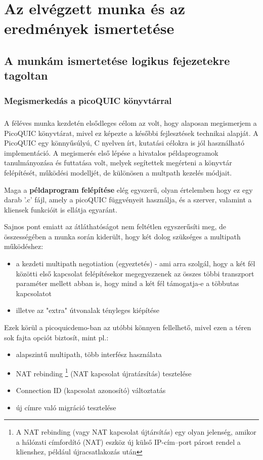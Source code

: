 \documentclass[a4paper,oneside]{article}
\begin{document}
\newpage
\section{Az elvégzett munka és az eredmények ismertetése}
\label{sec:az-elvegzett-munka}


\subsection{A munkám ismertetése logikus fejezetekre tagoltan}
\label{sec:a-munkam-ismert}

\subsubsection{Megismerkedás a picoQUIC könyvtárral}

\subparagraph{}
A féléves munka kezdetén elsődleges célom az volt, hogy alaposan megismerjem a 
PicoQUIC könyvtárat, mivel ez képezte a későbbi 
fejlesztések technikai alapját. A PicoQUIC egy könnyűsúlyú, C nyelven írt, kutatási 
célokra is jól használható implementáció. A megismerés első lépése a hivatalos példaprogramok 
tanulmányozása és futtatása volt, melyek segítettek megérteni a könyvtár felépítését, 
működési modelljét, de különösen a multpath kezelés módjait.

Maga a \textbf{példaprogram felépítése} elég egyszerű, olyan értelemben hogy ez egy darab '.c' fájl, amely a picoQUIC függvényeit használja, 
és a szerver, valamint a kliensek funkcióit is ellátja egyaránt. 

Sajnos pont emiatt az átláthatóságot nem feltétlen egyszerűsíti meg, de összességében 
a munka során kiderült, hogy két dolog szükséges a multipath működéshez:

\begin{itemize}

  \item a kezdeti multipath negotiation (egyeztetés) - ami arra szolgál, hogy a két fél közötti első
  kapcsolat felépítésekor megegyezzenek az összes többi transzport paraméter mellett abban is, 
  hogy mind a két fél támogatja-e a többutas kapcsolatot

  \item illetve az "extra" útvonalak tényleges kiépítése

\end{itemize}

Ezek körül a picoquicdemo-ban az utóbbi könnyen fellelhető, mivel ezen a téren sok fajta opciót biztosít, mint pl.:
\begin{itemize}
  \item alapszintű multipath, több interfész használata
  \item NAT rebinding \footnote{A NAT rebinding (vagy NAT kapcsolat újtársítás) egy olyan jelenség, 
  amikor a hálózati címfordító (NAT) eszköz új külső IP-cím–port párost rendel a klienshez, 
  például újracsatlakozás után} (NAT kapcsolat újratársítás) tesztelése
  \item Connection ID (kapcsolat azonosító) változtatás 
  \item új címre való migráció tesztelése
\end{itemize}
\end{document}
